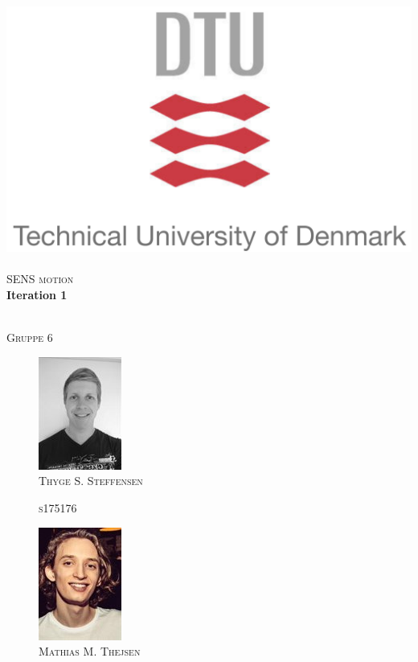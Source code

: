 \begin{titlepage}
\begin{center}

\includegraphics{pictures/frontpage/dtu-logo.png}~\\[0.5cm]
\textsc{\Large SENS motion } \\%

\HRule 
{ \huge \bfseries Iteration 1 \\[0.1cm] } %

\HRule \\[0.8cm]
\textsc{Gruppe 6}
\begin{multicols}{4}
\columnbreak
    \begin{figure}[H]
        \centering
        \includegraphics[scale=0.6]{pictures/frontpage/Thyge.png}\\
        \textsc{Thyge S. Steffensen}
        
        \textsc{s175176}\\
        \hfill \break
        \hfill \break
    \end{figure}
\columnbreak
    \begin{figure}[H]
        \centering
        \includegraphics[scale=0.8]{pictures/frontpage/mathias.png}\\
        \textsc{Mathias M. Thejsen}
        

\end{figure}
\end{multicols}
\end{center}
\end{titlepage}
